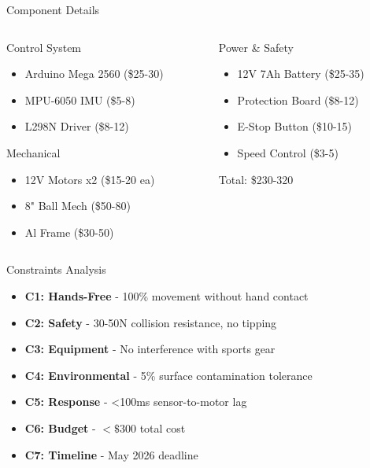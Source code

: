 \documentclass[aspectratio=169]{beamer}
\begin{document}
\begin{frame}{Component Details}
\footnotesize
\begin{columns}[T]
\begin{column}{0.48\textwidth}
\begin{block}{Control System}
\begin{itemize}
    \item Arduino Mega 2560 (\$25-30)
    \item MPU-6050 IMU (\$5-8)
    \item L298N Driver (\$8-12)
\end{itemize}
\end{block}

\begin{block}{Mechanical}
\begin{itemize}
    \item 12V Motors x2 (\$15-20 ea)
    \item 8" Ball Mech (\$50-80)
    \item Al Frame (\$30-50)
\end{itemize}
\end{block}
\end{column}

\begin{column}{0.48\textwidth}
\begin{block}{Power \& Safety}
\begin{itemize}
    \item 12V 7Ah Battery (\$25-35)
    \item Protection Board (\$8-12)
    \item E-Stop Button (\$10-15)
    \item Speed Control (\$3-5)
\end{itemize}
\end{block}

\vspace{0.3cm}
\begin{block}{Total: \$230-320}
\end{block}
\end{column}
\end{columns}
\end{frame}

\begin{frame}{Constraints Analysis}
\footnotesize
\begin{itemize}
    \item \textbf{C1: Hands-Free} - 100\% movement without hand contact
    \item \textbf{C2: Safety} - 30-50N collision resistance, no tipping
    \item \textbf{C3: Equipment} - No interference with sports gear
    \item \textbf{C4: Environmental} - 5\% surface contamination tolerance
    \item \textbf{C5: Response} - <100ms sensor-to-motor lag
    \item \textbf{C6: Budget} - $<\$300$ total cost
    \item \textbf{C7: Timeline} - May 2026 deadline
\end{itemize}
\end{frame}
\end{document}
